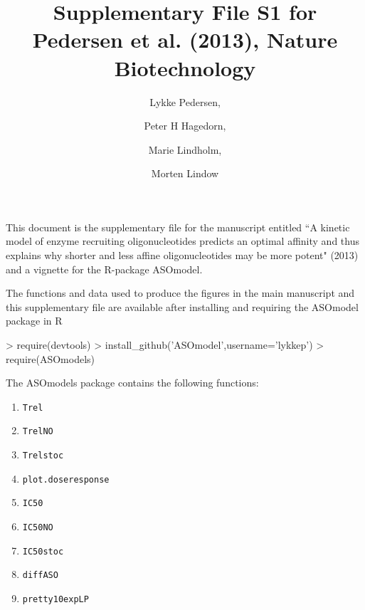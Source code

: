 \documentclass[a4paper,11pt]{article}
\title{Supplementary File S1 for Pedersen et al. (2013), Nature Biotechnology}
\author{Lykke Pedersen, \and Peter H Hagedorn, \and Marie Lindholm, \and Morten Lindow}
\date{}
\begin{document}

\maketitle

This document is the supplementary file for the manuscript entitled ``A kinetic model of enzyme recruiting oligonucleotides predicts an optimal affinity and thus explains why shorter and less affine oligonucleotides may be more potent" (2013) and a vignette for the R-package ASOmodel.


The functions and data used to produce the figures in the main manuscript and this supplementary file are available after installing and requiring the ASOmodel package in R
\begin{Schunk}
\begin{Sinput}
> require(devtools)
> install_github('ASOmodel',username='lykkep')
> require(ASOmodels)
\end{Sinput}
\end{Schunk}
The ASOmodels package contains the following functions:
\begin{enumerate}
\item \texttt{Trel}
\item \texttt{TrelNO}
\item \texttt{Trelstoc}
\item \texttt{plot.doseresponse}
\item \texttt{IC50}
\item \texttt{IC50NO}
\item \texttt{IC50stoc}
\item \texttt{diffASO}
\item \texttt{pretty10expLP}
\end{enumerate}

\newpage

\tableofcontents
\end{document}
